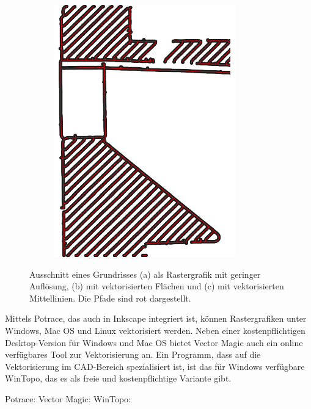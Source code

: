 \begin{figure}[h!tbp]
\begin{subfigure}{.3\textwidth}
  \caption{}
\end{subfigure}%
\begin{subfigure}{.3\textwidth}
  \centering
  \includegraphics[width=.8\linewidth]{bilder/vektor_vektorisierungStrichzeichnungC.pdf}
  \caption{}
\end{subfigure}%
\caption{Ausschnitt eines Grundrisses (a) als Rastergrafik mit geringer Auflösung, (b) mit vektorisierten Flächen und (c) mit vektorisierten Mittellinien. Die Pfade sind rot dargestellt.}
\label{abb:vektor_vektorisierungStrichzeichnung}
\end{figure}

Mittels Potrace, das auch in Inkscape integriert ist, können Rastergrafiken unter Windows, Mac OS und Linux vektorisiert werden. Neben einer kostenpflichtigen Desktop-Version für Windows und Mac OS bietet Vector Magic auch ein online verfügbares Tool zur Vektorisierung an. Ein Programm, dass auf die Vektorisierung im CAD-Bereich spezialisiert ist, ist das für Windows verfügbare WinTopo, das es als freie und kostenpflichtige Variante gibt.

\begin{flushleft}
	Potrace: 
	Vector Magic: 
	WinTopo: 
\end{flushleft}

